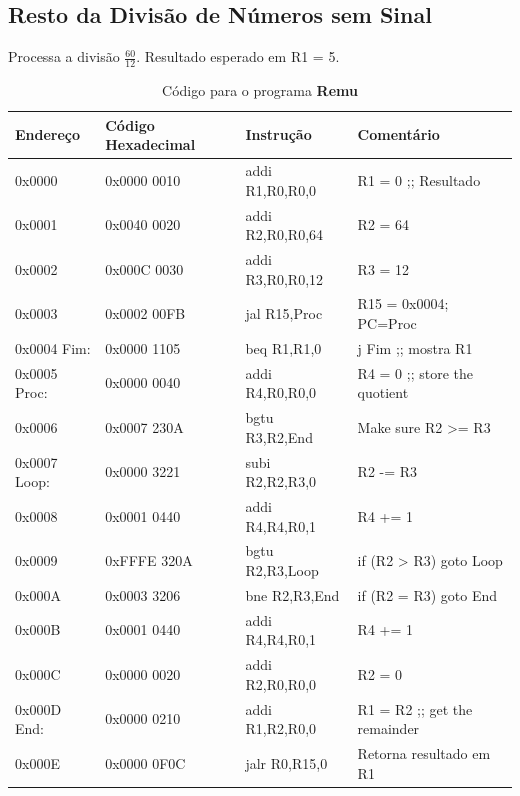 \documentclass[12pt]{article}
\begin{document}
\subsection{Resto da Divisão de Números sem Sinal}\label{sec:programs:remu}

Processa a divisão $\frac{60}{12}$. Resultado esperado em R1 = 5.

\begin{table}[H]
    \centering
    \caption{Código para o programa \textbf{Remu}}
    \begin{tabular}{|l|l|l|l|}\hline
        \textbf{Endereço} & \textbf{Código Hexadecimal} & \textbf{Instrução} & \textbf{Comentário} \\\hline
        0x0000       & 0x0000 0010 & addi R1,R0,R0,0  & R1 = 0 ;; Resultado           \\\hline
        0x0001       & 0x0040 0020 & addi R2,R0,R0,64 & R2 = 64                       \\\hline
        0x0002       & 0x000C 0030 & addi R3,R0,R0,12 & R3 = 12                       \\\hline
        0x0003       & 0x0002 00FB & jal R15,Proc     & R15 = 0x0004; PC=Proc         \\\hline
        0x0004 Fim:  & 0x0000 1105 & beq R1,R1,0      & j Fim ;; mostra R1            \\\hline
        0x0005 Proc: & 0x0000 0040 & addi R4,R0,R0,0  & R4 = 0 ;; store the quotient  \\\hline
        0x0006       & 0x0007 230A & bgtu R3,R2,End   & Make sure R2 >= R3            \\\hline
        0x0007 Loop: & 0x0000 3221 & subi R2,R2,R3,0  & R2 -= R3                      \\\hline
        0x0008       & 0x0001 0440 & addi R4,R4,R0,1  & R4 += 1                       \\\hline
        0x0009       & 0xFFFE 320A & bgtu R2,R3,Loop  & if (R2 > R3) goto Loop        \\\hline
        0x000A       & 0x0003 3206 & bne  R2,R3,End   & if (R2 \!= R3) goto End       \\\hline
        0x000B       & 0x0001 0440 & addi R4,R4,R0,1  & R4 += 1                       \\\hline
        0x000C       & 0x0000 0020 & addi R2,R0,R0,0  & R2 = 0                        \\\hline
        0x000D End:  & 0x0000 0210 & addi R1,R2,R0,0  & R1 = R2 ;; get the remainder  \\\hline
        0x000E       & 0x0000 0F0C & jalr R0,R15,0    & Retorna resultado em R1       \\\hline
    \end{tabular}\label{tab:programs:remu}
\end{table}
\end{document}
